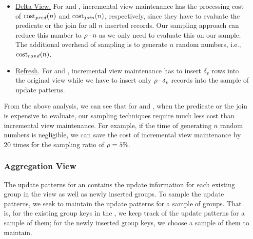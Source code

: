


\vspace{-.5em}

\begin{itemize} %
\item \underline{Delta View.} For \spview and \fjview, incremental view maintenance has the processing cost of $\textrm{cost}_{pred}(n)$ and $\textrm{cost}_{join}(n)$, respectively, since they have to evaluate the predicate or the join for all $n$ inserted records. Our sampling approach can reduce this number to $\rho  \cdot n$ as we only need to evaluate this on our sample. The additional overhead of sampling is to generate $n$ random numbers, i.e., $\textrm{cost}_{rand}(n)$. \vspace{-0.5em}
\item \underline{Refresh.} For \spview and \fjview, incremental view maintenance has to insert $\delta_v$ rows into the original view while we have to insert only $\rho  \cdot \delta_v$ records into the sample of update patterns. %
\end{itemize}
\vspace{-.5em}

From the above analysis, we can see that for \spview and \fjview, when the predicate or the join is expensive to evaluate, our sampling techniques require much less cost than incremental view maintenance. For example, if the time of generating $n$ random numbers is negligible, we can save the cost of incremental view maintenance by 20 times for the sampling ratio of $\rho  = 5 \%$.

\subsubsection{Aggregation View}
The update patterns for an \aggview contains the update information for each existing group in the view as well as newly inserted groups. 
To sample the update patterns, we seek to maintain the update patterns for a sample of groups. That is, for the existing group keys in the \aggview, we keep track of the update patterns for a sample of them; for the newly inserted group keys, we choose a sample of them to maintain. 

